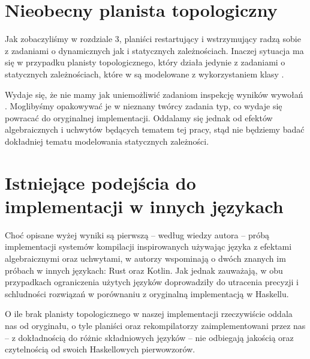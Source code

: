


\section{Nieobecny planista topologiczny}

Jak zobaczyliśmy w rozdziale 3, planiści restartujący i wstrzymujący radzą sobie z zadaniami o dynamicznych jak i statycznych zależnościach. Inaczej sytuacja ma się w przypadku planisty topologicznego, który działa jedynie z zadaniami o statycznych zależnościach, które w \BSaLC{} są modelowane z wykorzystaniem klasy .

Wydaje się, że nie mamy jak uniemożliwić zadaniom inspekcję wyników wywołań . Moglibyśmy opakowywać je w nieznany twórcy zadania typ, co wydaje się powracać do oryginalnej implementacji. Oddalamy się jednak od efektów algebraicznych i uchwytów będących tematem tej pracy, stąd nie będziemy badać dokładniej tematu modelowania statycznych zależności.

\section{Istniejące podejścia do implementacji w innych językach}

Choć opisane wyżej wyniki są pierwszą -- według wiedzy autora -- próbą implementacji systemów kompilacji inspirowanych \BSaLC{} używając języka z efektami algebraicznymi oraz uchwytami, w \BSaLCTP{} autorzy wspominają o dwóch znanych im próbach w innych językach: Rust\cite{translation_rust} oraz Kotlin\cite{translation_kotlin}. Jak jednak zauważają, w obu przypadkach ograniczenia użytych języków doprowadziły do utracenia precyzji i schludności rozwiązań w porównaniu z oryginalną implementacją w Haskellu.

O ile brak planisty topologicznego w naszej implementacji rzeczywiście oddala nas od oryginału, o tyle planiści oraz rekompilatorzy zaimplementowani przez nas -- z dokładnością do różnic składniowych języków -- nie odbiegają jakością oraz czytelnością od swoich Haskellowych pierwowzorów.
